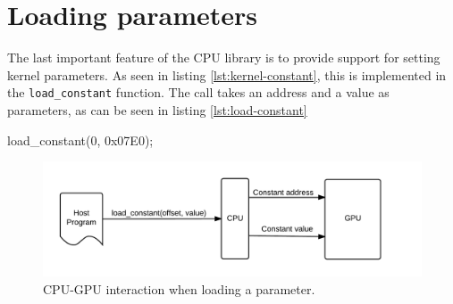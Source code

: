 \section{Loading parameters}
The last important feature of the CPU library is to provide support for setting kernel parameters.
As seen in listing \ref{lst:kernel-constant}, this is implemented in the \verb/load_constant/ function.
The call takes an address and a value as parameters, as can be seen in listing \ref{lst:load-constant}

\begin{c-code}[caption=Setting a kernel parameter, label=lst:load-constant]
load_constant(0, 0x07E0);
\end{c-code}

\begin{figure}[H]
    \centering
    \includegraphics[width=\textwidth]{../cpu/diagrams/loading_a_constant.png}
    \caption{CPU-GPU interaction when loading a parameter.}
    \label{fig:loading_a_constant}
\end{figure}
